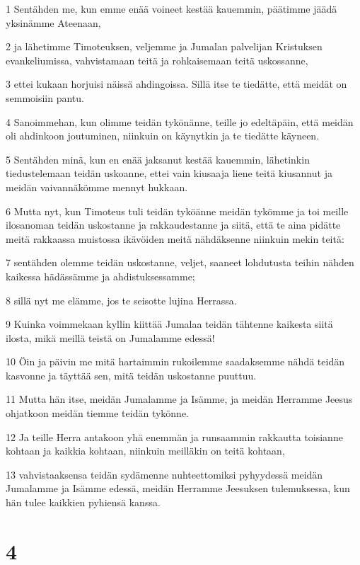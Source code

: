 \par 1 Sentähden me, kun emme enää voineet kestää kauemmin, päätimme jäädä yksinämme Ateenaan,
\par 2 ja lähetimme Timoteuksen, veljemme ja Jumalan palvelijan Kristuksen evankeliumissa, vahvistamaan teitä ja rohkaisemaan teitä uskossanne,
\par 3 ettei kukaan horjuisi näissä ahdingoissa. Sillä itse te tiedätte, että meidät on semmoisiin pantu.
\par 4 Sanoimmehan, kun olimme teidän tykönänne, teille jo edeltäpäin, että meidän oli ahdinkoon joutuminen, niinkuin on käynytkin ja te tiedätte käyneen.
\par 5 Sentähden minä, kun en enää jaksanut kestää kauemmin, lähetinkin tiedustelemaan teidän uskoanne, ettei vain kiusaaja liene teitä kiusannut ja meidän vaivannäkömme mennyt hukkaan.
\par 6 Mutta nyt, kun Timoteus tuli teidän tyköänne meidän tykömme ja toi meille ilosanoman teidän uskostanne ja rakkaudestanne ja siitä, että te aina pidätte meitä rakkaassa muistossa ikävöiden meitä nähdäksenne niinkuin mekin teitä:
\par 7 sentähden olemme teidän uskostanne, veljet, saaneet lohdutusta teihin nähden kaikessa hädässämme ja ahdistuksessamme;
\par 8 sillä nyt me elämme, jos te seisotte lujina Herrassa.
\par 9 Kuinka voimmekaan kyllin kiittää Jumalaa teidän tähtenne kaikesta siitä ilosta, mikä meillä teistä on Jumalamme edessä!
\par 10 Öin ja päivin me mitä hartaimmin rukoilemme saadaksemme nähdä teidän kasvonne ja täyttää sen, mitä teidän uskostanne puuttuu.
\par 11 Mutta hän itse, meidän Jumalamme ja Isämme, ja meidän Herramme Jeesus ohjatkoon meidän tiemme teidän tykönne.
\par 12 Ja teille Herra antakoon yhä enemmän ja runsaammin rakkautta toisianne kohtaan ja kaikkia kohtaan, niinkuin meilläkin on teitä kohtaan,
\par 13 vahvistaaksensa teidän sydämenne nuhteettomiksi pyhyydessä meidän Jumalamme ja Isämme edessä, meidän Herramme Jeesuksen tulemuksessa, kun hän tulee kaikkien pyhiensä kanssa.

\chapter{4}

